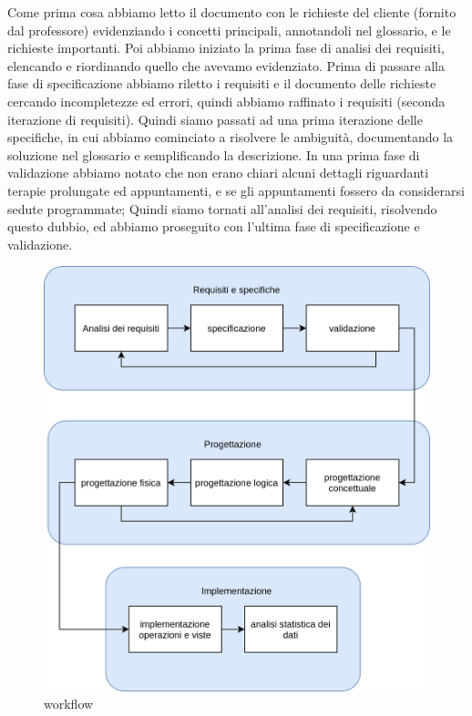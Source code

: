 \documentclass[11pt]{article}
\begin{document}
Come prima cosa abbiamo letto il documento con le richieste del cliente (fornito dal professore)
evidenziando i concetti principali, annotandoli nel glossario, e le richieste importanti. Poi abbiamo iniziato la prima fase di 
analisi dei requisiti, elencando e riordinando quello che avevamo evidenziato.
Prima di passare alla fase di specificazione abbiamo riletto i requisiti e il documento delle richieste cercando
incompletezze ed errori, quindi abbiamo raffinato i requisiti (seconda iterazione di requisiti).
Quindi siamo passati ad una prima iterazione delle specifiche, in cui abbiamo cominciato a
risolvere le ambiguità, documentando la soluzione nel glossario e semplificando la descrizione.
In una prima fase di validazione abbiamo notato che non erano chiari alcuni dettagli riguardanti
terapie prolungate ed appuntamenti, e se gli appuntamenti fossero da considerarsi sedute programmate;
Quindi siamo tornati all'analisi dei requisiti, risolvendo questo dubbio, ed abbiamo proseguito
con l'ultima fase di specificazione e validazione.

\begin{figure}[H]
    \includegraphics[width=\linewidth]{images/workflow.png}
    \caption{workflow}
    \label{fig:workflow}
\end{figure}
\end{document}
